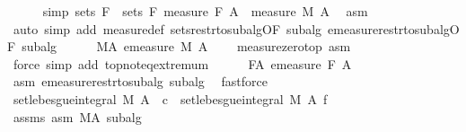 \begin{isabellebody}
\ \ \ \ \isamarkupfalse%
\ {\isacharbrackleft}{\kern0pt}simp{\isacharbrackright}{\kern0pt}{\isacharcolon}{\kern0pt}\ {\isachardoublequoteopen}sets\ {\isacharquery}{\kern0pt}F\ {\isacharequal}{\kern0pt}\ sets\ F{\isachardoublequoteclose}\ {\isachardoublequoteopen}measure\ {\isacharquery}{\kern0pt}F\ A\ {\isacharequal}{\kern0pt}\ measure\ M\ A{\isachardoublequoteclose}\ \isamarkupfalse%
\ asm\ \isamarkupfalse%
\ {\isacharparenleft}{\kern0pt}auto\ simp\ add{\isacharcolon}{\kern0pt}\ measure{\isacharunderscore}{\kern0pt}def\ sets{\isacharunderscore}{\kern0pt}restr{\isacharunderscore}{\kern0pt}to{\isacharunderscore}{\kern0pt}subalg{\isacharbrackleft}{\kern0pt}OF\ subalg{\isacharbrackright}{\kern0pt}\ emeasure{\isacharunderscore}{\kern0pt}restr{\isacharunderscore}{\kern0pt}to{\isacharunderscore}{\kern0pt}subalg{\isacharbrackleft}{\kern0pt}OF\ subalg{\isacharbrackright}{\kern0pt}{\isacharparenright}{\kern0pt}\isanewline
\ \ \ \ \isamarkupfalse%
\ M{\isacharunderscore}{\kern0pt}A{\isacharcolon}{\kern0pt}\ {\isachardoublequoteopen}emeasure\ M\ A\ {\isacharless}{\kern0pt}\ {\isasyminfinity}{\isachardoublequoteclose}\ \isamarkupfalse%
\ measure{\isacharunderscore}{\kern0pt}zero{\isacharunderscore}{\kern0pt}top\ asm\ \isamarkupfalse%
\ {\isacharparenleft}{\kern0pt}force\ simp\ add{\isacharcolon}{\kern0pt}\ top{\isachardot}{\kern0pt}not{\isacharunderscore}{\kern0pt}eq{\isacharunderscore}{\kern0pt}extremum{\isacharparenright}{\kern0pt}\isanewline
\ \ \ \ \isamarkupfalse%
\ F{\isacharunderscore}{\kern0pt}A{\isacharcolon}{\kern0pt}\ {\isachardoublequoteopen}emeasure\ {\isacharquery}{\kern0pt}F\ A\ {\isacharless}{\kern0pt}\ {\isasyminfinity}{\isachardoublequoteclose}\ \isamarkupfalse%
\ asm{\isacharparenleft}{\kern0pt}{}{\isacharparenright}{\kern0pt}\ emeasure{\isacharunderscore}{\kern0pt}restr{\isacharunderscore}{\kern0pt}to{\isacharunderscore}{\kern0pt}subalg\ subalg\ \isamarkupfalse%
\ fastforce\isanewline
\ \ \ \ \isamarkupfalse%
\ {\isachardoublequoteopen}set{\isacharunderscore}{\kern0pt}lebesgue{\isacharunderscore}{\kern0pt}integral\ M\ A\ {\isacharparenleft}{\kern0pt}{\isasymlambda}{\isacharunderscore}{\kern0pt}{\isachardot}{\kern0pt}\ c{\isacharparenright}{\kern0pt}\ {\isasymle}\ set{\isacharunderscore}{\kern0pt}lebesgue{\isacharunderscore}{\kern0pt}integral\ M\ A\ f{\isachardoublequoteclose}\ \isamarkupfalse%
\ assms\ asm\ M{\isacharunderscore}{\kern0pt}A\ subalg\ \isamarkupfalse%

\end{isabellebody}

